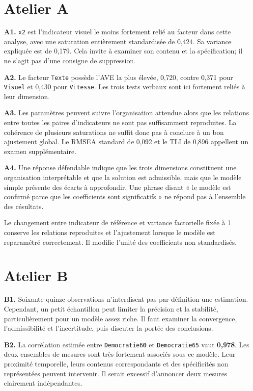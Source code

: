 \documentclass[
  french,
  11pt,
  a4paper,
  DIV=11,
  numbers=noendperiod]{scrreprt}
\begin{document}
\section{Atelier A}\label{atelier-a}

\textbf{A1.} \texttt{x2} est l'indicateur visuel le moins fortement
relié au facteur dans cette analyse, avec une saturation entièrement
standardisée de 0,424. Sa variance expliquée est de 0,179. Cela invite à
examiner son contenu et la spécification; il ne s'agit pas d'une
consigne de suppression.

\textbf{A2.} Le facteur \texttt{Texte} possède l'AVE la plus élevée,
0,720, contre 0,371 pour \texttt{Visuel} et 0,430 pour \texttt{Vitesse}.
Les trois tests verbaux sont ici fortement reliés à leur dimension.

\textbf{A3.} Les paramètres peuvent suivre l'organisation attendue alors
que les relations entre toutes les paires d'indicateurs ne sont pas
suffisamment reproduites. La cohérence de plusieurs saturations ne
suffit donc pas à conclure à un bon ajustement global. Le RMSEA standard
de 0,092 et le TLI de 0,896 appellent un examen supplémentaire.

\textbf{A4.} Une réponse défendable indique que les trois dimensions
constituent une organisation interprétable et que la solution est
admissible, mais que le modèle simple présente des écarts à approfondir.
Une phrase disant « le modèle est confirmé parce que les coefficients
sont significatifs » ne répond pas à l'ensemble des résultats.

Le changement entre indicateur de référence et variance factorielle
fixée à 1 conserve les relations reproduites et l'ajustement lorsque le
modèle est reparamétré correctement. Il modifie l'unité des coefficients
non standardisés.

\section{Atelier B}\label{atelier-b}

\textbf{B1.} Soixante-quinze observations n'interdisent pas par
définition une estimation. Cependant, un petit échantillon peut limiter
la précision et la stabilité, particulièrement pour un modèle assez
riche. Il faut examiner la convergence, l'admissibilité et
l'incertitude, puis discuter la portée des conclusions.

\textbf{B2.} La corrélation estimée entre \texttt{Democratie60} et
\texttt{Democratie65} vaut \textbf{0,978}. Les deux ensembles de mesures
sont très fortement associés sous ce modèle. Leur proximité temporelle,
leurs contenus correspondants et des spécificités non représentées
peuvent intervenir. Il serait excessif d'annoncer deux mesures
clairement indépendantes.
\end{document}
